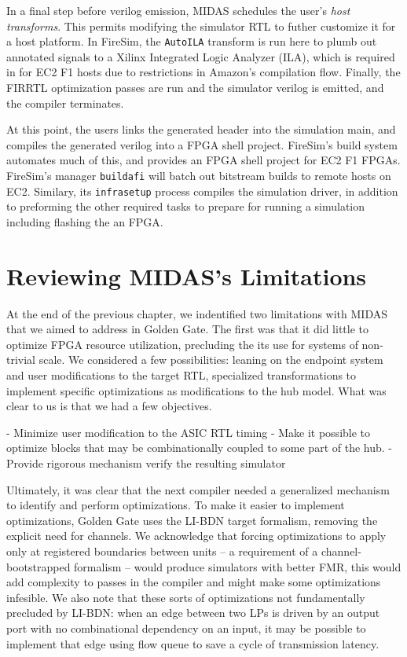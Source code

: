     In a final step before verilog emission, MIDAS schedules the user's
    \emph{host transforms}.  This permits modifying the simulator RTL to futher
    customize it for a host platform. In FireSim, the \texttt{AutoILA}
    transform is run here to plumb out annotated signals to a Xilinx Integrated
    Logic Analyzer (ILA), which is required in for EC2 F1 hosts due to
    restrictions in Amazon's compilation flow. Finally, the FIRRTL optimization passes are run
    and the simulator verilog is emitted, and the compiler terminates.

    At this point, the users links the generated header into the simulation
    main, and compiles the generated verilog into a FPGA shell project.
    FireSim's build system automates much of this, and provides an FPGA shell
    project for EC2 F1 FPGAs. FireSim's manager \texttt{buildafi} will batch
    out bitstream builds to remote hosts on EC2. Similary, its
    \texttt{infrasetup} process compiles the simulation driver, in addition to
    preforming the other required tasks to prepare for running a simulation
    including flashing the an FPGA.

\section{Reviewing MIDAS's Limitations}

    At the end of the previous chapter, we indentified two limitations with MIDAS 
    that we aimed to address in Golden Gate. The first was that it did little to optimize
    FPGA resource utilization, precluding the its use for systems of non-trivial scale. 
    We considered a few possibilities: leaning on the endpoint system and user modifications to the target RTL,
    specialized transformations to implement specific optimizations as modifications to the hub model. What was clear to us
    is that we had a few objectives.

    - Minimize user modification to the ASIC RTL timing
    - Make it possible to optimize blocks that may be combinationally coupled to some part of the hub.
    - Provide rigorous mechanism verify the resulting simulator


    Ultimately, it was clear that the next compiler needed a generalized
    mechanism to identify and perform optimizations. To make it easier to
    implement optimizations, Golden Gate uses the LI-BDN target formalism,
    removing the explicit need for channels. We acknowledge that forcing
    optimizations to apply only at registered boundaries between units -- a
    requirement of a channel-bootstrapped formalism -- would produce simulators
    with better FMR, this would add complexity to passes in the compiler and
    might make some optimizations infesible.  We also note that these sorts of
    optimizations not fundamentally precluded by LI-BDN: when an edge between
    two LPs is driven by an output port with no combinational dependency on an
    input, it may be possible to implement that edge using flow queue to save a
    cycle of transmission latency.


